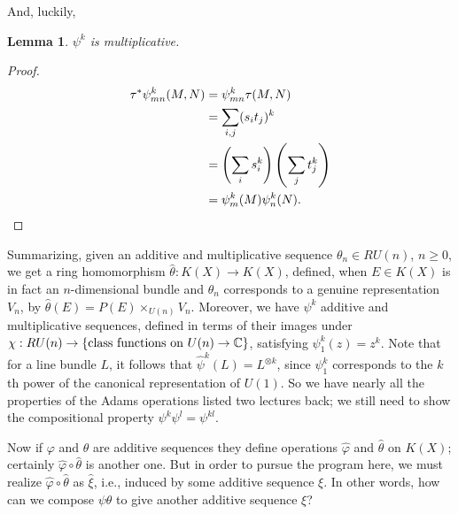 \documentclass{article}
\newcommand{\C}{\mathbb{C}}
\newtheorem{lem}[thm]{Lemma}
\begin{document}
And, luckily,
\begin{lem}
$\psi^k$ is multiplicative.
\end{lem}
\begin{proof}
\begin{align*}
\tau^* \psi^k_{mn}(M, N) & = \psi^k_{mn} \tau(M, N) \\
& = \sum_{i, j}(s_i t_j)^k \\
& = \left( \sum_i s_i^k \right) \left( \sum_j t_j^k \right) \\
& = \psi^k_m(M) \psi^k_n(N).\qedhere
\end{align*}
\end{proof}

Summarizing, given an additive and multiplicative sequence $\theta_n \in RU(n)$, $n \ge 0$, we get a ring homomorphism $\hat \theta: K(X) \to K(X)$, defined, when $E \in K(X)$ is in fact an $n$-dimensional bundle and $\theta_n$ corresponds to a genuine representation $V_n$, by $\hat \theta(E) = P(E) \times_{U(n)} V_n$.  Moreover, we have $\psi^k$ additive and multiplicative sequences, defined in terms of their images under $\chi: RU(n) \to \{\hbox{class functions on $U(n) \to \C$}\}$, satisfying $\psi^k_1(z) = z^k$.  Note that for a line bundle $L$, it follows that $\hat \psi^k(L) = L^{\otimes k}$, since $\psi^k_1$ corresponds to the $k$th power of the canonical representation of $U(1)$.  So we have nearly all the properties of the Adams operations listed two lectures back; we still need to show the compositional property $\psi^k \psi^l = \psi^{kl}$.

Now if $\varphi$ and $\theta$ are additive sequences they define operations $\hat \varphi$ and $\hat \theta$ on $K(X)$; certainly $\hat \varphi \circ \hat \theta$ is another one.  But in order to pursue the program here, we must realize $\hat \varphi \circ \hat \theta$ as $\hat \xi$, i.e., induced by some additive sequence $\xi$.  In other words, how can we compose $\psi \theta$ to give another additive sequence $\xi$?
\end{document}
